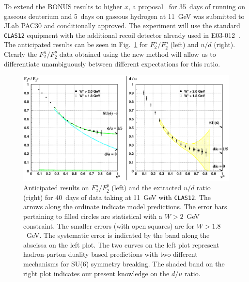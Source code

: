To extend the BONUS results to higher $x$, a proposal~\cite{BONUS12} for 
35~days of running on gaseous deuterium and 5~days on gaseous hydrogen at 
11~GeV was submitted to JLab PAC30 and conditionally approved.  The experiment 
will use the standard {\tt CLAS12} equipment with the additional recoil 
detector already used in E03-012~\cite{BONUS}.  The anticipated results can be 
seen in Fig.~\ref{fig:b12xpctd} for $F_2^n/F_2^p$ (left) and $u/d$ (right). 
Clearly the $F_2^n/F_2^p$ data obtained using the new method will allow us to 
differentiate unambiguously between different expectations for this ratio.

\begin{figure}[ht!]
\begin{center}
\centerline{\includegraphics[scale=0.4, angle=0]{../strucfunc/bonus_12_xpctd.eps}}
\end{center}
\vspace*{-1cm}
\caption{\small{Anticipated results on $F_2^n/F_2^p$ (left) and the extracted 
$u/d$ ratio (right) for 40~days of data taking at 11~GeV with {\tt CLAS12}.  
The arrows along the ordinate indicate model predictions.  The error bars 
pertaining to filled circles are statistical with a $W>2$~GeV constraint.  
The smaller errors (with open squares) are for $W>1.8$~GeV.  The systematic 
error is indicated by the band along the abscissa on the left plot.  The two 
curves on the left plot represent hadron-parton duality based predictions 
with two different mechanisms for SU(6) symmetry breaking. The shaded band 
on the right plot indicates our present knowledge on the $d/u$ ratio.}}
\label{fig:b12xpctd}
\end{figure}

